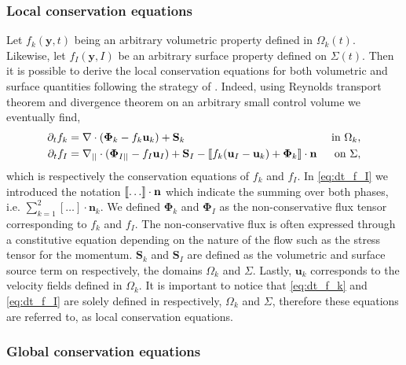 \subsubsection*{Local conservation equations}


Let $f_k(\textbf{y},t)$ being an arbitrary volumetric property defined in $\Omega_k(t)$. 
Likewise, let $f_I(\textbf{y},I)$ be an arbitrary surface property defined on $\Sigma(t)$.
Then it is possible to derive the local conservation equations for both volumetric and surface quantities following the strategy of \citep{bothe2022sharp,morel2015mathematical,tignol1986modelisation,marle1982macroscopic}.
Indeed, using Reynolds transport theorem  and divergence theorem on an arbitrary small control volume we eventually find,
\begin{align}
    \label{eq:dt_f_k}
    \partial_t f_k
    &= \mathbf{\nabla} \cdot \left(
        \mathbf{\Phi}_k
        - f_k\textbf{u}_k
        \right)
    + \textbf{S}_k
    & \text{ in } \Omega_k,&\\
    \partial_t f_I  
    &= 
    \mathbf{\nabla}_{||} \cdot (\mathbf{\Phi}_{I||} - f_I \textbf{u}_I)
    + \textbf{S}_I
    - \llbracket 
        f_k (\textbf{u}_I - \textbf{u}_k)
        + \mathbf{\Phi}_k
      \rrbracket \cdot \textbf{n} 
    & \text{ on } \Sigma,&
    \label{eq:dt_f_I}
\end{align}
which is respectively the conservation equations of $f_k$ and $f_I$.
In \ref{eq:dt_f_I} we introduced the notation $\llbracket \ldots \rrbracket \cdot \textbf{n}$ which indicate the summing over both phases, i.e. $\sum_{k=1}^2 [\ldots] \cdot \textbf{n}_k$. 
We defined $\mathbf{\Phi}_k$ and $\mathbf{\Phi}_I$ as the non-conservative flux tensor corresponding to $f_k$ and $f_I$. 
The non-conservative flux is often expressed through a constitutive equation depending on the nature of the flow such as the stress tensor for the momentum.
$\textbf{S}_k$ and $\textbf{S}_I$ are defined as the volumetric and surface source term on respectively, the domains $\Omega_k$ and $\Sigma$. 
Lastly, $\textbf{u}_k$ corresponds to the velocity fields defined in $\Omega_k$. 
It is important to notice that \ref{eq:dt_f_k} and \ref{eq:dt_f_I} are solely defined in respectively, $\Omega_k$ and $\Sigma$, therefore these equations are referred to, as local conservation equations.

\subsubsection*{Global conservation equations}

